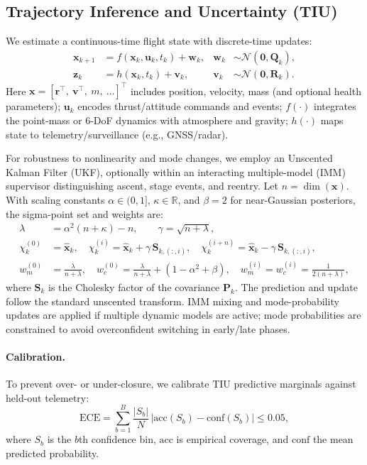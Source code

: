 \documentclass[journal]{new-aiaa}
\begin{document}
\subsection{Trajectory Inference and Uncertainty (TIU)}
We estimate a continuous-time flight state with discrete-time updates:
\begin{align}
    \mathbf{x}_{k+1} &= f\!\left(\mathbf{x}_k, \mathbf{u}_k, t_k\right) + \mathbf{w}_k, 
    & \mathbf{w}_k &\sim \mathcal{N}\!\left(\mathbf{0},\mathbf{Q}_k\right), \label{eq:process}\\
    \mathbf{z}_k &= h\!\left(\mathbf{x}_k, t_k\right) + \mathbf{v}_k,
    & \mathbf{v}_k &\sim \mathcal{N}\!\left(\mathbf{0},\mathbf{R}_k\right). \label{eq:measure}
\end{align}
Here $\mathbf{x}=[\mathbf{r}^\top,\ \mathbf{v}^\top,\ m,\ \dots]^\top$ includes position, velocity, mass (and optional health parameters); $\mathbf{u}_k$ encodes thrust/attitude commands and events; $f(\cdot)$ integrates the point-mass or 6-DoF dynamics with atmosphere and gravity; $h(\cdot)$ maps state to telemetry/surveillance (e.g., \si{GNSS}/radar).

For robustness to nonlinearity and mode changes, we employ an Unscented Kalman Filter (UKF), optionally within an interacting multiple-model (IMM) supervisor distinguishing ascent, stage events, and reentry. Let $n=\dim(\mathbf{x})$. With scaling constants $\alpha\in(0,1]$, $\kappa\in\mathbb{R}$, and $\beta=2$ for near-Gaussian posteriors, the sigma-point set and weights are:
\begin{align}
    \lambda &= \alpha^2(n+\kappa)-n, \qquad \gamma=\sqrt{n+\lambda},\\
    \chi^{(0)}_k &= \hat{\mathbf{x}}_k,\quad
    \chi^{(i)}_k = \hat{\mathbf{x}}_k + \gamma\,\mathbf{S}_{k,(:,i)},\quad
    \chi^{(i+n)}_k = \hat{\mathbf{x}}_k - \gamma\,\mathbf{S}_{k,(:,i)},\\
    w^{(0)}_m &= \frac{\lambda}{n+\lambda},\quad
    w^{(0)}_c = \frac{\lambda}{n+\lambda} + (1-\alpha^2+\beta),\quad
    w^{(i)}_m=w^{(i)}_c=\frac{1}{2(n+\lambda)},
\end{align}
where $\mathbf{S}_k$ is the Cholesky factor of the covariance $\mathbf{P}_k$. The prediction and update follow the standard unscented transform. IMM mixing and mode-probability updates are applied if multiple dynamic models are active; mode probabilities are constrained to avoid overconfident switching in early/late phases.

\paragraph{Calibration.}
To prevent over- or under-closure, we calibrate TIU predictive marginals against held-out telemetry:
\begin{equation}
    \mathrm{ECE} = \sum_{b=1}^B \frac{|S_b|}{N}\,\bigl| \mathrm{acc}(S_b) - \mathrm{conf}(S_b) \bigr| \le 0.05,
\end{equation}
where $S_b$ is the $b$th confidence bin, $\mathrm{acc}$ is empirical coverage, and $\mathrm{conf}$ the mean predicted probability.
\end{document}
